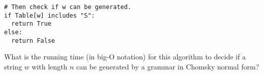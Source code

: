\documentclass[11pt]{exam}
\begin{document}
\begin{questions}
\begin{tcolorbox}
\begin{verbatim}
# Then check if w can be generated.
if Table[w] includes "S":
  return True
else:
  return False
\end{verbatim}
\end{tcolorbox}
What is the running time (in big-O notation) for this algorithm to decide if a string $w$ with length $n$ can be generated by a grammar in Chomsky normal form?  
\vfill
\end{questions}
\end{document}
